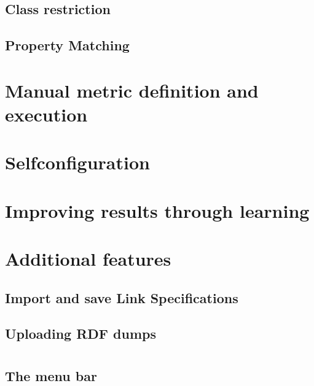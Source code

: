 \documentclass[oneside,a4paper,12pt]{memoir}
\begin{document}
	\section{Class restriction}
	\label{classes}
	\section{Property Matching}
	\label{properties}
\chapter{Manual metric definition and execution}
\label{manual}

\chapter{Selfconfiguration}
\label{selfconfig}

\chapter{Improving results through learning}
\label{learning}

\chapter{Additional features}
\label{features}
\section{Import and save Link Specifications}
\label{ImportExport}

\section{Uploading RDF dumps}
\label{upload}




\newpage
\appendix
\chapter{}
\section{The menu bar}
\label{menuBar}
\end{document}
